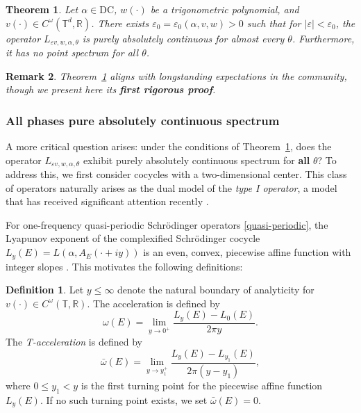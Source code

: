 \documentclass[11pt]{amsart}
\newtheorem{theorem}{Theorem}[section]
\newtheorem{rem}[theorem]{Remark}
\theoremstyle{remark}
\theoremstyle{definition}
\newtheorem{definition}{Definition}
\newcommand{\R}{{\mathbf R}}
\newcommand{\T}{{\mathbf T}}
\def\R{{\mathbb R}}
\def\T{{\mathbb T}}
\begin{document}
\begin{theorem}\label{ac}
    Let $\alpha \in \mathrm{DC}$, $w(\cdot)$ be a trigonometric polynomial, and $v(\cdot) \in C^\omega(\mathbb{T}^d, \mathbb{R})$. There exists $\varepsilon_0 = \varepsilon_0(\alpha, v, w) > 0$ such that for $|\varepsilon| < \varepsilon_0$, the operator $L_{\varepsilon v, w, \alpha, \theta}$ is purely absolutely continuous  for almost every $\theta$.  
    Furthermore, it has no point spectrum for all $\theta$.
\end{theorem}


\begin{rem}
Theorem~\ref{ac} aligns with longstanding expectations in the  community, though we present here its \textbf{first rigorous proof}. 
\end{rem}

 \subsubsection{All phases pure absolutely continuous spectrum}

 
 A more critical question arises: under the conditions of Theorem~\ref{ac}, does the operator \( L_{\varepsilon v, w, \alpha, \theta} \) exhibit purely absolutely continuous spectrum for  \textbf{all} \(\theta\)? To address this, we first consider cocycles with a two-dimensional center. This class of operators naturally arises as the dual model of the {\it type I operator}, a model that has received significant attention recently \cite{GJ,GJY,GJYZ,hs,HS}.
 
For one-frequency quasi-periodic Schr\"odinger operators \eqref{quasi-periodic}, the Lyapunov exponent of the complexified Schr\"odinger cocycle \( L_y(E) = L(\alpha, A_E(\cdot + iy)) \) is an even, convex, piecewise affine function with integer slopes \cite{avila}. This motivates the following definitions:
 
\begin{definition}\label{acc}\cite{avila,GJY}
Let \( y \leq \infty \) denote the natural boundary of analyticity for \( v(\cdot) \in C^\omega(\T,\R) \). The acceleration is defined by
\[
\omega(E) = \lim_{y \to 0^+} \frac{L_y(E) - L_0(E)}{2\pi y}.
\]
The {\it T-acceleration} is defined by
\[
\bar{\omega}(E) = \lim_{y \to y_1^+} \frac{L_y(E) - L_{y_1}(E)}{2\pi(y - y_1)},
\]
where \( 0 \leq y_1 < y \) is the first turning point for the piecewise affine function \( L_y(E) \). If no such turning point exists, we set \( \bar{\omega}(E) = 0 \).
\end{definition}
 
\end{document}

